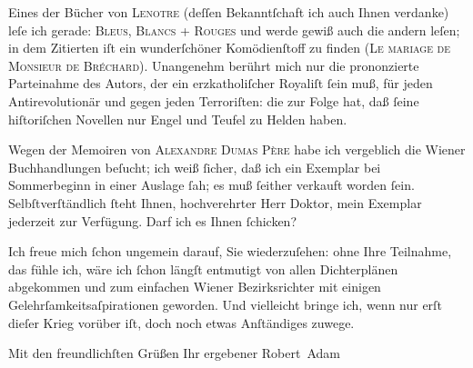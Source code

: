 \pstart
           Eines der Bücher von \textsc{Lenotre} (deſſen Bekanntſchaft ich auch Ihnen verdanke) leſe ich gerade: \textsc{Bleus, Blancs + Rouges} und werde gewiß auch die andern leſen; in dem Zitierten iſt ein wunderſchöner
               Komödienſtoff zu finden (\textsc{Le mariage de Monsieur de Bréchard}). Unangenehm berührt mich nur die prononzierte Parteinahme des Autors, der ein
               erzkatholiſcher Royaliſt{ }ſein muß, für jeden Antirevolutionär und gegen jeden
               Terroriſten: die zur Folge hat, daß{ }ſeine hiſtoriſchen Novellen nur Engel und Teu{\pb}fel zu Helden haben.\pend
           
\pstart
           Wegen der Memoiren von \textsc{Alexandre Dumas Père} habe ich vergeblich die Wiener
               Buchhandlungen beſucht; ich weiß{ }ſicher, daß ich ein Exemplar bei Sommerbeginn in
               einer Auslage{ }ſah; es muß{ }ſeither verkauft worden{ }ſein. Selbſtverſtändlich{ }ſteht
               Ihnen, hochverehrter Herr Doktor, mein Exemplar jederzeit zur Verfügung. Darf ich es
               Ihnen{ }ſchicken?\pend
           
\pstart
           Ich freue mich{ }ſchon ungemein darauf, Sie wiederzuſehen: ohne Ihre Teilnahme, das
               fühle ich, wäre ich{ }ſchon längſt entmutigt von allen Dichterplänen abgekommen und zum
               einfachen Wiener Bezirksrichter mit einigen
               Gelehrſamkeitsaſpirationen geworden. Und vielleicht bringe ich, wenn nur erſt dieſer
               Krieg vorüber iſt, doch noch etwas Anſtändiges zuwege.\pend
           
\pstart
           Mit den freundlichſten Grüßen Ihr ergebener\pend
           \pstart \spacefill\mbox{Robert Adam}\pend{}\endnumbering{}  \newcommand{\dateiname}{L02241}\newcommand{\titel}{Robert Adam an Arthur Schnitzler, 24. 9. 1916}\newcommand{\editorInnen}{Martin Anton Müller und Gerd-Hermann Susen}
